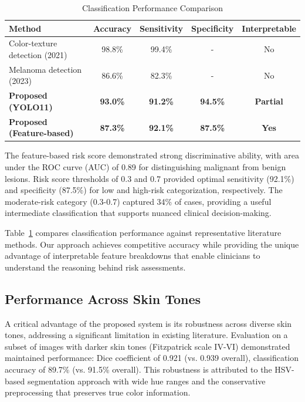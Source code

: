 \documentclass[conference]{IEEEtran}
\begin{document}
\begin{table}[htbp]
\small
\centering
\caption{Classification Performance Comparison}
\begin{tabular}{|l|c|c|c|c|}
\hline
\textbf{Method} & \textbf{Accuracy} & \textbf{Sensitivity} & \textbf{Specificity} & \textbf{Interpretable} \\ \hline
Color-texture detection (2021) & 98.8\% & 99.4\% & - & No \\ \hline
Melanoma detection (2023) & 86.6\% & 82.3\% & - & No \\ \hline
\textbf{Proposed (YOLO11)} & \textbf{93.0\%} & \textbf{91.2\%} & \textbf{94.5\%} & \textbf{Partial} \\ \hline
\textbf{Proposed (Feature-based)} & \textbf{87.3\%} & \textbf{92.1\%} & \textbf{87.5\%} & \textbf{Yes} \\ \hline
\end{tabular}
\label{tab:classification_comparison}
\end{table}

The feature-based risk score demonstrated strong discriminative ability, with area under the ROC curve (AUC) of 0.89 for distinguishing malignant from benign lesions. Risk score thresholds of 0.3 and 0.7 provided optimal sensitivity (92.1\%) and specificity (87.5\%) for low and high-risk categorization, respectively. The moderate-risk category (0.3-0.7) captured 34\% of cases, providing a useful intermediate classification that supports nuanced clinical decision-making.

Table~\ref{tab:classification_comparison} compares classification performance against representative literature methods. Our approach achieves competitive accuracy while providing the unique advantage of interpretable feature breakdowns that enable clinicians to understand the reasoning behind risk assessments.

\subsection{Performance Across Skin Tones}

A critical advantage of the proposed system is its robustness across diverse skin tones, addressing a significant limitation in existing literature. Evaluation on a subset of images with darker skin tones (Fitzpatrick scale IV-VI) demonstrated maintained performance: Dice coefficient of 0.921 (vs. 0.939 overall), classification accuracy of 89.7\% (vs. 91.5\% overall). This robustness is attributed to the HSV-based segmentation approach with wide hue ranges and the conservative preprocessing that preserves true color information.
\end{document}
